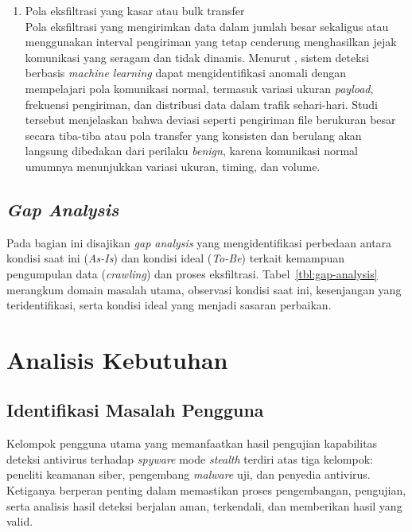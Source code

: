 \begin{enumerate}
    \item Pola eksfiltrasi yang kasar atau bulk transfer \\
    Pola eksfiltrasi yang mengirimkan data dalam jumlah besar sekaligus atau menggunakan interval pengiriman yang tetap cenderung menghasilkan jejak komunikasi yang seragam dan tidak dinamis. Menurut \textcite{sabir2021mldetect}, sistem deteksi berbasis \textit{machine learning} dapat mengidentifikasi anomali dengan mempelajari pola komunikasi normal, termasuk variasi ukuran \textit{payload}, frekuensi pengiriman, dan distribusi data dalam trafik sehari-hari. Studi tersebut menjelaskan bahwa deviasi seperti pengiriman file berukuran besar secara tiba-tiba atau pola transfer yang konsisten dan berulang akan langsung dibedakan dari perilaku \textit{benign}, karena komunikasi normal umumnya menunjukkan variasi ukuran, timing, dan volume.
\end{enumerate}

\subsection{\textit{Gap Analysis}}
Pada bagian ini disajikan \textit{gap analysis} yang mengidentifikasi perbedaan antara kondisi saat ini (\textit{As-Is}) dan kondisi ideal (\textit{To-Be}) terkait kemampuan pengumpulan data (\textit{crawling}) dan proses eksfiltrasi. Tabel~\ref{tbl:gap-analysis} merangkum domain masalah utama, observasi kondisi saat ini, kesenjangan yang teridentifikasi, serta kondisi ideal yang menjadi sasaran perbaikan.


\section{Analisis Kebutuhan}
\subsection{Identifikasi Masalah Pengguna}

Kelompok pengguna utama yang memanfaatkan hasil pengujian kapabilitas deteksi antivirus terhadap \textit{spyware} mode \textit{stealth} terdiri atas tiga kelompok: peneliti keamanan siber, pengembang \textit{malware} uji, dan penyedia antivirus. Ketiganya berperan penting dalam memastikan proses pengembangan, pengujian, serta analisis hasil deteksi berjalan aman, terkendali, dan memberikan hasil yang valid.

